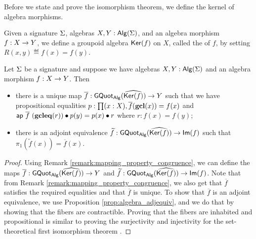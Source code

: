 Before we state and prove the isomorphism theorem, we define the kernel of algebra morphisms.

\begin{definition}[Kernel]
Given a signature $\Sigma$, algebras $X, Y : \mathsf{Alg}(\Sigma)$, and an algebra morphism $f : X \rightarrow Y$, we define a groupoid algebra $\mathsf{Ker}(f)$ on $X$, called the  of $f$, by setting $R(x, y) \eqdef f(x) = f(y)$.
\end{definition}

\begin{theorem}\label{thm:iso_thm}
Let $\Sigma$ be a signature and suppose we have algebras $X, Y : \mathsf{Alg}(\Sigma)$ and an algebra morphism $f : X \rightarrow Y$.
Then
\begin{itemize}
	\item there is a unique map $\overline{f} : \mathsf{GQuot}_{\mathsf{Alg}}(\widehat{\mathsf{Ker}(f)}) \rightarrow Y$ such that we have propositional equalities $p : \prod (x : X) , \overline{f}(\operatorname{\mathbf{gcl}}(x)) = f(x)$ and $\mathsf{ap} \ \overline{f} \ (\operatorname{\mathbf{gcleq}}(r)) \bullet p(y) = p(x) \bullet r$ where $r : f(x) = f(y)$;
	\item there is an adjoint equivalence $\widetilde{f} : \mathsf{GQuot}_{\mathsf{Alg}}(\widehat{\mathsf{Ker}(f)}) \rightarrow \mathsf{Im}(f)$ such that $\pi_1(\widetilde{f}(x)) = \overline{f}(x)$.
\end{itemize}
\end{theorem}

\begin{proof}
Using Remark \ref{remark:mapping_property_congruence}, we can define the maps $\overline{f} : \mathsf{GQuot}_{\mathsf{Alg}}(\widehat{\mathsf{Ker}(f)}) \rightarrow Y$ and $\widetilde{f} : \mathsf{GQuot}_{\mathsf{Alg}}(\widehat{\mathsf{Ker}(f)}) \rightarrow \mathsf{Im}(f)$.
Note that from Remark \ref{remark:mapping_property_congruence}, we also get that $\overline{f}$ satisfies the required equalities and that $\overline{f}$ is unique.
To show that $\overline{f}$ is an adjoint equivalence, we use Proposition \ref{prop:algebra_adjequiv}, and we do that by showing that the fibers are contractible.
Proving that the fibers are inhabited and propositional is similar to proving the surjectivity and injectivity for the set-theoretical first isomorphism theorem \cite{lynge2019}.
\end{proof}